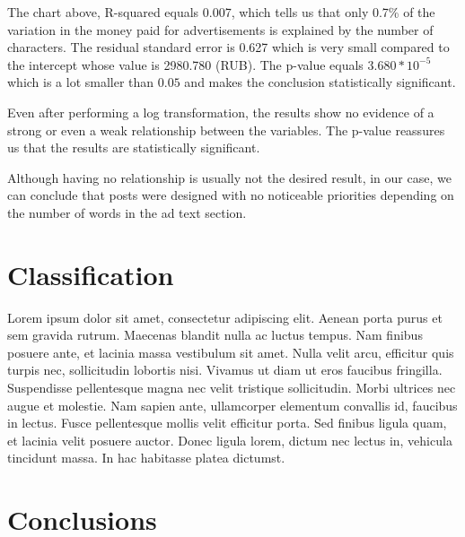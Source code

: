 \documentclass{article}
\begin{document}
The chart above, R-squared equals 0.007, which tells us that only 0.7\%
of the variation in the money paid for advertisements is explained by the
number of characters. The residual standard error is 0.627 which is very small
compared to the intercept whose value is 2980.780 (RUB). The p-value equals
$3.680 * 10^{-5}$ which is a lot smaller than $0.05$ and makes the conclusion
statistically significant.

\medskip

Even after performing a log transformation, the results show no evidence of a
strong or even a weak relationship between the variables. The p-value reassures
us that the results are statistically significant.

\medskip

Although having no relationship is usually not the desired result, in our case,
we can conclude that posts were designed with no noticeable priorities
depending on the number of words in the ad text section.


\section{Classification}

Lorem ipsum dolor sit amet, consectetur adipiscing elit.
Aenean porta purus et sem gravida rutrum.
Maecenas blandit nulla ac luctus tempus.
Nam finibus posuere ante, et lacinia massa vestibulum sit amet.
Nulla velit arcu, efficitur quis turpis nec, sollicitudin lobortis nisi.
Vivamus ut diam ut eros faucibus fringilla.
Suspendisse pellentesque magna nec velit tristique sollicitudin.
Morbi ultrices nec augue et molestie.
Nam sapien ante, ullamcorper elementum convallis id, faucibus in lectus.
Fusce pellentesque mollis velit efficitur porta.
Sed finibus ligula quam, et lacinia velit posuere auctor.
Donec ligula lorem, dictum nec lectus in, vehicula tincidunt massa.
In hac habitasse platea dictumst.


\section{Conclusions}
\end{document}
